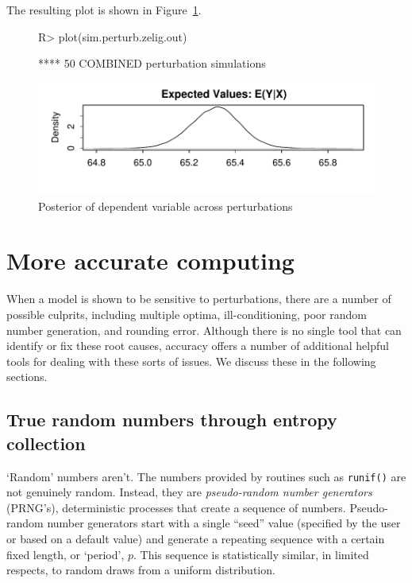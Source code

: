 \documentclass[11pt]{article}
\let\code=\texttt
\newcommand{\pkg}[1]{{\normalfont\fontseries{b}\selectfont #1}}
\begin{document}
The resulting plot is shown in Figure~\ref{fig:plot2}.

\begin{figure}
\begin{Schunk}
\begin{Sinput}
R> plot(sim.perturb.zelig.out)
\end{Sinput}
\begin{Soutput}
**** 50  COMBINED perturbation simulations 
\end{Soutput}
\end{Schunk}
\includegraphics{accuracy_vignette-plot2a}
\caption{\label{fig:plot2} Posterior of dependent variable across perturbations}
\end{figure}


\section{More accurate computing} 

When a model is shown to be sensitive to perturbations, there are a number of possible culprits, including multiple optima, ill-conditioning, poor random number generation, and rounding error. Although there is no single tool that can identify or fix these root causes, \pkg{accuracy} offers a number of additional helpful tools for dealing with these sorts of issues. We discuss these in the following sections. 

\subsection{True random numbers through entropy collection}

`Random' numbers aren't. The numbers provided by routines such as \code{runif()} are not genuinely random.
 Instead, they are \emph{pseudo-random number generators}
(PRNG's), deterministic processes that create a sequence of numbers. 
Pseudo-random number generators start with a single ``seed'' value (specified by the user or based on a default value)
 and generate a repeating sequence with a certain
fixed length, or `period', $p$. This sequence is statistically
similar, in limited respects, to random draws from a uniform
distribution.
\end{document}
